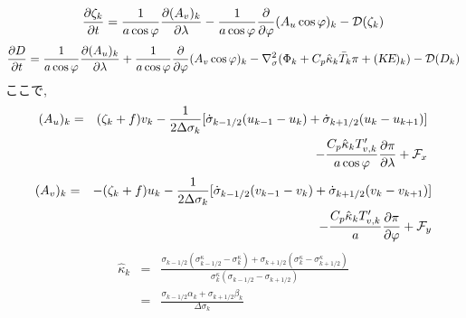 \begin{enumerate}
\begin{equation}
  \label{渦度結局}
  \frac{\partial \zeta_k}{\partial t} 
        =   \frac{1}{a\cos\varphi} 
            \frac{\partial (A_v)_k}{\partial \lambda}
          - \frac{1}{a\cos\varphi} 
            \frac{\partial }{\partial \varphi} (A_u \cos\varphi)_k
          - {\cal D}(\zeta_k) 
\end{equation}
%
\begin{equation}
  \frac{\partial D}{\partial t} 
        =   \frac{1}{a\cos\varphi} 
            \frac{\partial (A_u)_k}{\partial \lambda}
          + \frac{1}{a\cos\varphi} 
            \frac{\partial }{\partial \varphi} (A_v \cos\varphi)_k
          - \nabla^{2}_{\sigma}
           ( \Phi_k + C_{p} \hat{\kappa}_k \bar{T}_k \pi 
             + (\mbox{\sl KE})_k )
          - {\cal D}(D_k) 
\end{equation}
%
ここで,
%
\begin{eqnarray}
  (A_u)_k
   & = & ( \zeta_k + f ) v_k 
             - \frac{1}{2 \Delta \sigma_k} 
             [   \dot{\sigma}_{k-1/2} ( u_{k-1} - u_k   )
               + \dot{\sigma}_{k+1/2} ( u_k   - u_{k+1} ) ]
           \nonumber \\
   &   &     - \frac{C_{p} \hat{\kappa}_k T_{v,k}'}{a\cos\varphi} 
                  \frac{\partial \pi}{\partial \lambda} 
             + {\cal F}_x
\end{eqnarray}
%
\begin{eqnarray}
  (A_v)_k
   & = & - ( \zeta_k + f ) u_k 
             - \frac{1}{2 \Delta \sigma_k} 
             [   \dot{\sigma}_{k-1/2} ( v_{k-1} - v_k   )
               + \dot{\sigma}_{k+1/2} ( v_k   - v_{k+1} ) ]
           \nonumber \\
   &   &     - \frac{C_{p} \hat{\kappa}_k T_{v,k}'}{a} 
               \frac{\partial \pi}{\partial \varphi} 
             + {\cal F}_y
\end{eqnarray}
%
\begin{eqnarray}
   \label{はっとかっぱ}
   \hat{\kappa}_k 
 &   =  &     \frac{  \sigma_{k-1/2}(   \sigma^{\kappa}_{k-1/2} 
                                    - \sigma^{\kappa}_k      ) 
                  + \sigma_{k+1/2}(   \sigma^{\kappa}_k 
                                    - \sigma^{\kappa}_{k+1/2}  ) }
                 { \sigma^{\kappa}_k
                     ( \sigma_{k-1/2} - \sigma_{k+1/2} )         } 
         \nonumber   \\
 & = & \frac{ \sigma_{k-1/2} \alpha_k + \sigma_{k+1/2} \beta_k }
            { \Delta \sigma_k                                  } 
\end{eqnarray}


\end{enumerate}
